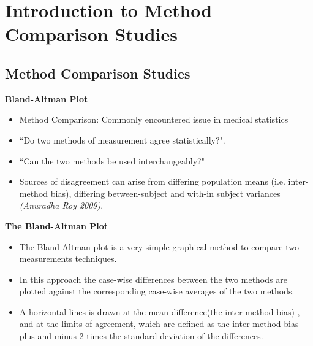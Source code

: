 \documentclass{beamer}
\makeatletter
\newcommand{\tcb}{\textcolor{beamer@blendedblue}}
\makeatother
\begin{document}
\section[Intro to MCS]{Introduction to Method Comparison Studies}
\subsection{Method Comparison Studies}
\begin{frame}{\bf \tcb{Bland-Altman Plot}}
	\vspace{-0.9cm}
	\begin{itemize}\itemsep0.5cm
		\item Method Comparison: Commonly encountered issue in medical statistics
		\item ``Do two methods of measurement agree statistically?".
		\item ``Can the two methods be used interchangeably?"
		\item Sources of disagreement can arise from differing population means (i.e. inter-method bias), differing between-subject and with-in subject variances \textit{(Anuradha Roy 2009)}.
	\end{itemize}
	
\end{frame}

\begin{frame}{\bf \tcb{The Bland-Altman Plot}}
	\vspace{-1cm}
	\begin{itemize}\itemsep0.5cm
		
		\item The Bland-Altman plot is a very simple graphical method to compare two measurements techniques. \item In this approach the case-wise differences between the two methods are plotted against the corresponding case-wise averages of the two methods.
		
		\item A horizontal lines is drawn at the mean difference(the inter-method bias) , and at the limits of agreement, which are defined as the inter-method bias plus and minus 2 times the standard deviation of the differences.
		
	\end{itemize}
\end{frame}
\end{document}

